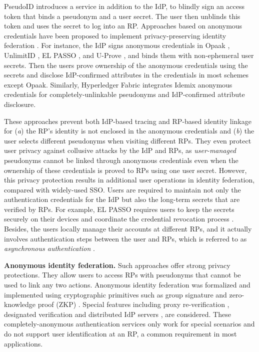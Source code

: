 PseudoID \cite{PseudoID} introduces a service in addition to the IdP,
 to blindly sign \cite{blind-sign}
an access token that binds a pseudonym and a user secret.
The user then unblinds this token and uses the secret to log into an RP. Approaches based on anonymous credentials \cite{anon-credential-2001, idemix, anon-credential} have been proposed to implement privacy-preserving identity federation \cite{hyperledge-idemix, Opaak, uprov, UnlimitID, ELPASSO}. For instance, the IdP signs anonymous credentials in Opaak \cite{Opaak}, UnlimitID \cite{UnlimitID}, EL PASSO \cite{ELPASSO}, and U-Prove \cite{uprov}, and binds them with non-ephemeral user secrets. %
Then the users prove ownership of the anonymous credentials using the secrets and disclose IdP-confirmed attributes in the credentials in most schemes except Opaak.
Similarly, Hyperledger Fabric \cite{hyperledge-idemix} integrates Idemix anonymous credentials \cite{idemix} for completely-unlinkable pseudonyms and IdP-confirmed attribute disclosure.


These approaches \cite{PseudoID,Opaak,ELPASSO,uprov,UnlimitID,hyperledge-idemix} prevent both IdP-based tracing and RP-based identity linkage for (\emph{a}) the RP's identity is not enclosed in the anonymous credentials and (\emph{b}) the user selects different pseudonyms when visiting different RPs.
They even protect user privacy against collusive attacks by the IdP and RPs, as \emph{user-managed} pseudonyms cannot be linked through anonymous credentials \cite{anon-credential-2001, idemix, anon-credential} even when the ownership of these credentials is proved to RPs using one user secret.
However, this privacy protection results in additional user operations in identity federation, compared with widely-used SSO.
Users are required to maintain not only the authentication credentials for the IdP but also the long-term secrets that are verified by RPs.
For example, EL PASSO \cite{ELPASSO} requires users to keep the secrets securely on their devices and coordinate the credential revocation process \cite{ELPASSO, UnlimitID}.
Besides, the users locally manage their accounts at different RPs, and it actually involves authentication steps between the user and RPs, which is referred to as \emph{asynchronous authentication} \cite{ELPASSO}.


\noindent\textbf{Anonymous identity federation.}
Such approaches offer strong privacy protections. They allow users to access RPs with pseudonyms that cannot be used to link any two actions.
Anonymous identity federation was formalized \cite{WangWS13} and implemented using cryptographic primitives such as group signature and zero-knowledge proof (ZKP) \cite{WangWS13, HanCSTWW20, HanCSTW18}. Special features including proxy re-verification \cite{HanCSTWW20}, designated verification \cite{HanCSTW18} and distributed IdP servers \cite{TSAPP}, are considered. %
These completely-anonymous authentication services only work for special scenarios and do not support user identification at an RP, a common requirement in most applications.
